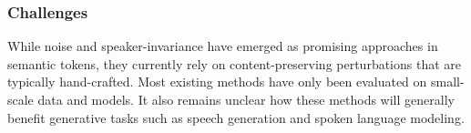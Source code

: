 \subsubsection{Challenges}
While noise and speaker-invariance have emerged as promising approaches in semantic tokens, they currently rely on content-preserving perturbations that are typically hand-crafted.
Most existing methods have only been evaluated on small-scale data and models.
It also remains unclear how these methods will generally benefit generative tasks such as speech generation and spoken language modeling.






